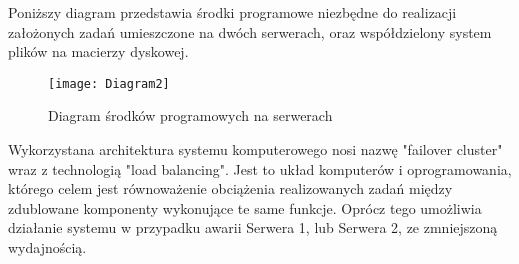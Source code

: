 					\par Poniższy diagram przedstawia środki programowe niezbędne do realizacji założonych zadań umieszczone na dwóch serwerach, oraz współdzielony system plików na macierzy dyskowej. 
		
					\begin{figure}[H]
						\centering
						\texttt{[image: Diagram2]}
						\caption{Diagram środków programowych na serwerach}
						\label{net_real}
					\end{figure}
				
					\par Wykorzystana architektura systemu komputerowego nosi nazwę "failover cluster" wraz z technologią "load balancing". Jest to układ komputerów i oprogramowania, którego celem jest równoważenie obciążenia realizowanych zadań między zdublowane komponenty wykonujące te same funkcje. Oprócz tego umożliwia działanie systemu w przypadku awarii Serwera 1, lub Serwera 2, ze zmniejszoną wydajnością.
 
